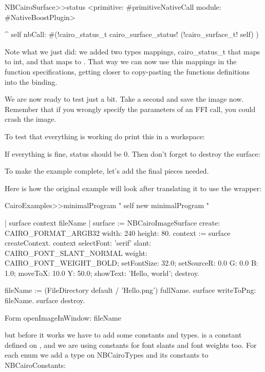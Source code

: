 \documentclass[a4paper,10pt,twoside]{book}
\begin{document}
\begin{code}{}
NBCairoSurface>>status
  <primitive: #primitiveNativeCall module: #NativeBoostPlugin>
	
  ^ self nbCall: #(!cairo\_status\_t cairo\_surface\_status! (!cairo\_surface\_t! self) )
\end{code}

Note what we just did: we added two types mappings, cairo\_status\_t
that maps to int, and  that maps to
. That way we can now use this mappings in the
function specifications, getting closer to copy-pasting the functions
definitions into the binding.

We are now ready to test just a bit. Take a second and save the
image now. Remember that if you wrongly specify the parameters
of an FFI call, you could crash the image.

To test that everything is working do print this in a workspace:


If everything is fine, status should be 0. Then don't forget
to destroy the surface:


To make the example complete, let's add the final pieces needed.

Here is how the original example will look after translating
it to use the wrapper:

\begin{code}{}
CairoExamples>>minimalProgram
  "
  self new minimalProgram
  "
  
  | surface context fileName |
  surface := NBCairoImageSurface create: CAIRO_FORMAT_ARGB32 width: 240 height: 80.
  context := surface createContext.
  context selectFont: 'serif' slant: CAIRO_FONT_SLANT_NORMAL weight: CAIRO_FONT_WEIGHT_BOLD;
      setFontSize: 32.0;
      setSourceR: 0.0 G: 0.0 B: 1.0;
      moveToX: 10.0 Y: 50.0;
      showText: 'Hello, world';
      destroy.

  fileName := (FileDirectory default / 'Hello.png') fullName.
  surface writeToPng: fileName.
  surface destroy.

  Form openImageInWindow: fileName
\end{code}


but before it works we have to add some constants and types.
 is a constant defined on
, and we are using constants for
font slants and font weights too. For each enum we add
a type on NBCairoTypes and its constants to NBCairoConstants:
\end{document}
